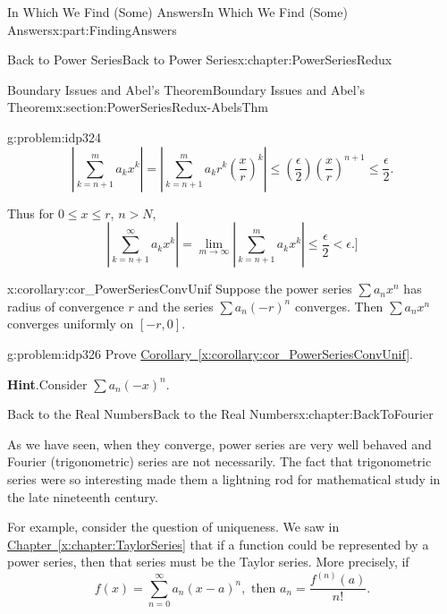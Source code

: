 \documentclass[oneside,10pt,]{book}
\newcommand{\blocktitlefont}{\relax}
\newcommand{\xreffont}{\relax}
\numberwithin{equation}{section}
\newcommand{\abs}[1]{\left|#1\right|}
\newcommand{\lt}{<}
\begin{document}
\begin{partptx}{In Which We Find (Some) Answers}{}{In Which We Find (Some) Answers}{}{}{x:part:FindingAnswers}
\begin{chapterptx}{Back to Power Series}{}{Back to Power Series}{}{}{x:chapter:PowerSeriesRedux}
\begin{sectionptx}{Boundary Issues and Abel's Theorem}{}{Boundary Issues and Abel's Theorem}{}{}{x:section:PowerSeriesRedux-AbelsThm}
\begin{problem}{}{g:problem:idp324}
\begin{equation*}
\abs{\sum_{k=n+1}^ma_kx^k}=\abs{\sum_{k=n+1}^ma_kr^k\left(\frac{x}{r}\right)^k}\leq \left(\frac{\epsilon}{2}\right)\left(\frac{x}{r}\right)^{n+1}\leq\frac{\epsilon}{2}\text{.}
\end{equation*}
%
\par
Thus for \(0\leq x\leq r\), \(n>N\),%
\begin{equation*}
\abs{\sum_{k=n+1}^\infty a_kx^k}=\lim_{m\rightarrow\infty}\abs{\sum_{k=n+1}^ma_kx^k}\leq\frac{\epsilon}{2}\lt \epsilon.\rbrack{}
\end{equation*}
%
\end{problem}
\begin{corollary}{}{}{x:corollary:cor_PowerSeriesConvUnif}%
Suppose the power series \(\sum a_nx^n\) has radius of convergence \(r\) and the series \(\sum a_n\left(-r\right)^n\) converges. Then \(\sum a_nx^n\) converges uniformly on \([-r,0]\).%
\end{corollary}
\begin{problem}{}{g:problem:idp326}%
Prove \hyperref[x:corollary:cor_PowerSeriesConvUnif]{Corollary~{\xreffont\ref{x:corollary:cor_PowerSeriesConvUnif}}}.%
\par\smallskip%
\noindent\textbf{\blocktitlefont Hint}.\hypertarget{g:hint:idp327}{}\quad{}Consider \(\sum a_n\left(-x\right)^n\).%
\end{problem}
\end{sectionptx}
\end{chapterptx}
%
\typeout{************************************************}
\typeout{************************************************}
%
\begin{chapterptx}{Back to the Real Numbers}{}{Back to the Real Numbers}{}{}{x:chapter:BackToFourier}
\begin{introduction}{}%
As we have seen, when they converge, power series are very well behaved and Fourier (trigonometric) series are not necessarily. The fact that trigonometric series were so interesting made them a lightning rod for mathematical study in the late nineteenth century.%
\par
For example, consider the question of uniqueness. We saw in \hyperref[x:chapter:TaylorSeries]{Chapter~{\xreffont\ref{x:chapter:TaylorSeries}}} that if a function could be represented by a power series, then that series must be the Taylor series. More precisely, if%
\begin{equation*}
f(x)=\sum_{n=0}^\infty a_n(x-a)^n, \text{  then  }  a_n=\frac{f^{(n)}(a)}{n!}\text{.}

\end{equation*}
\end{introduction}
\end{chapterptx}
\end{partptx}
\end{document}
